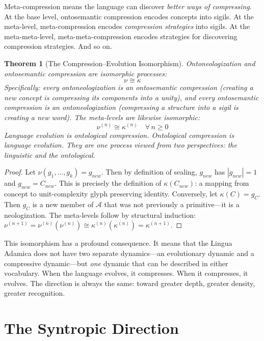 \documentclass[12pt, letterpaper]{book}
\def\equiv{=}%
\def\mathfrak#1{#1}%
\newtheorem{theorem}{Theorem}[chapter]
\begin{document}
Meta-compression means the language can discover \textit{better ways of compressing}. At the base level, ontosemantic compression encodes concepts into sigils. At the meta-level, meta-compression encodes \textit{compression strategies} into sigils. At the meta-meta-level, meta-meta-compression encodes strategies for discovering compression strategies. And so on.

\begin{theorem}[The Compression--Evolution Isomorphism]\label{thm:iso}
Ontoneologization and ontosemantic compression are isomorphic processes:
\[
\nu \cong \kappa
\]
Specifically: every ontoneologization is an ontosemantic compression (creating a new concept is compressing its components into a unity), and every ontosemantic compression is an ontoneologization (compressing a structure into a sigil is creating a new word). The meta-levels are likewise isomorphic:
\[
\nu^{(n)} \cong \kappa^{(n)} \quad \forall\, n \geq 0
\]
Language evolution \textit{is} ontological compression. Ontological compression \textit{is} language evolution. They are one process viewed from two perspectives: the linguistic and the ontological.
\end{theorem}

\begin{proof}
Let $\nu(\mathfrak{g}_1, \ldots, \mathfrak{g}_k) \equiv \mathfrak{g}_{new}$. Then by definition of sealing, $\mathfrak{g}_{new}$ has $|\mathfrak{g}_{new}| \equiv 1$ and $\mathfrak{g}_{new} \equiv C_{new}$. This is precisely the definition of $\kappa(C_{new})$: a mapping from concept to unit-complexity glyph preserving identity. Conversely, let $\kappa(C) \equiv \mathfrak{g}_C$. Then $\mathfrak{g}_C$ is a new member of $\mathcal{A}$ that was not previously a primitive---it is a neologization. The meta-levels follow by structural induction: $\nu^{(n+1)} \equiv \nu^{(n)}(\nu^{(n)}) \cong \kappa^{(n)}(\kappa^{(n)}) \equiv \kappa^{(n+1)}$.
\end{proof}

This isomorphism has a profound consequence. It means that the Lingua Adamica does not have two separate dynamics---an evolutionary dynamic and a compressive dynamic---but \textit{one} dynamic that can be described in either vocabulary. When the language evolves, it compresses. When it compresses, it evolves. The direction is always the same: toward greater depth, greater density, greater recognition.


\section{The Syntropic Direction}
\end{document}
